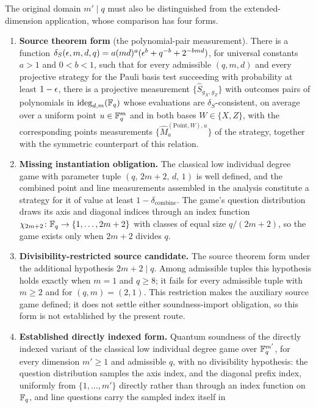 \documentclass[11pt]{article}
\begin{document}
The original domain $m'\mid q$ must also be distinguished from the
extended-dimension application, whose comparison has four forms.
\begin{enumerate}
  \item \textbf{Source theorem form} (the polynomial-pair measurement).  There
  is a function $\delta_S(\epsilon,m,d,q) = a(md)^a(\epsilon^b + q^{-b} + 2^{-bmd})$,
  for universal constants $a > 1$ and $0 < b < 1$, such that for every
  admissible $(q,m,d)$ and every projective strategy for the Pauli basis test
  succeeding with probability at least $1-\epsilon$, there is a projective
  measurement $\{\hat S_{g_X,g_Z}\}$ with outcomes pairs of polynomials in
  $\mathrm{ideg}_{d,m}(\mathbb{F}_q)$ whose evaluations are $\delta_S$-consistent, on
  average over a uniform point $u \in \mathbb{F}_q^m$ and in both bases
  $W \in \{X,Z\}$, with the corresponding points measurements
  $\{\hat M^{(\mathrm{Point},W),u}_a\}$ of the strategy, together with the
  symmetric counterpart of this relation.
  \item \textbf{Missing instantiation obligation.}  The classical low
  individual degree game with parameter tuple $(q,\, 2m+2,\, d,\, 1)$ is well
  defined, and the combined point and line measurements assembled in the
  analysis constitute a strategy for it of value at least
  $1 - \delta_{\mathrm{combine}}$.  The game's question distribution draws
  its axis and diagonal indices through an index function
  $\chi_{2m+2}\colon \mathbb{F}_q \to \{1,\ldots,2m+2\}$ with classes of equal size
  $q/(2m+2)$, so the game exists only when $2m+2$ divides $q$.
  \item \textbf{Divisibility-restricted source candidate.}  The source theorem
  form under the additional hypothesis $2m+2 \mid q$.  Among
  admissible tuples this hypothesis holds exactly when $m = 1$ and
  $q \ge 8$; it fails for every admissible tuple with $m \ge 2$ and for
  $(q,m) = (2,1)$.  This restriction makes the auxiliary source game defined;
  it does not settle either soundness-import obligation, so this form is not
  established by the present route.
  \item \textbf{Established directly indexed form.}  Quantum
  soundness of the directly indexed variant of the classical low individual
  degree game over $\mathbb{F}_q^{m'}$, for every dimension $m' \ge 1$ and
  admissible $q$, with no divisibility hypothesis: the question
  distribution samples the axis index, and the diagonal prefix index,
  uniformly from $\{1,\ldots,m'\}$ directly rather than through an index
  function on $\mathbb{F}_q$, and line questions carry the sampled index itself in

\end{enumerate}
\end{document}
